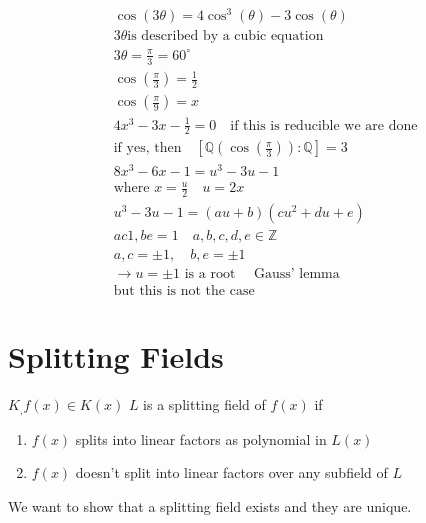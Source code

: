 \documentclass{article}
\begin{document}
\begin{align*}
    &\cos(3\theta) = 4\cos^3(\theta) - 3\cos(\theta) \\ 
    &3\theta \text{is described by a cubic equation} \\
    &3\theta = \frac{\pi}{3} = 60^{\circ} \\
    &\cos(\frac{\pi}{3}) = \frac{1}{2} \\ 
    &\cos(\frac{\pi}{9}) = x \\ 
    &4x^3 - 3x - \frac{1}{2} = 0 \quad \text{if this is reducible we are done} \\ 
    &\text{if yes, then} \quad [\mathbb{Q}(\cos(\frac{\pi}{3})): \mathbb{Q}] = 3\\
    &8x^3 - 6x - 1 = u^3 -3u -1 \\ 
    &\text{where } x = \frac{u}{2} \quad u = 2x \\ 
    &u^3 - 3u - 1 = (au + b)(cu^2 + du + e) \\
    & ac 1 , be = 1 \quad a,b,c,d,e \in \mathbb{Z} \\ 
    &a,c = \pm 1, \quad b,e = \pm 1 \\
    &\rightarrow u = \pm 1 \text{ is a root} \quad  \text{ Gauss' lemma} \\ 
    &\text{but this is not the case}
\end{align*}
\section{Splitting Fields}
$K_, f(x) \in K(x)$
$L$ is a splitting field of $f(x)$ if \begin{enumerate}
    \item $f(x)$ splits into linear factors as polynomial in $L(x)$
    \item $f(x)$ doesn't split into linear factors over any subfield of $L$
\end{enumerate}
We want to show that a splitting field exists and they are unique. 
\end{document}
